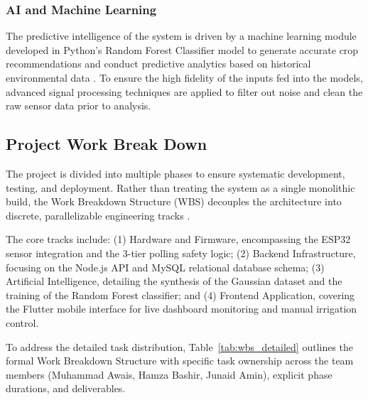 \subsubsection{AI and Machine Learning}
The predictive intelligence of the system is driven by a machine learning module developed in Python's Random Forest Classifier model to generate accurate crop recommendations and conduct predictive analytics based on historical environmental data \cite{musanase2023data}. To ensure the high fidelity of the inputs fed into the models, advanced signal processing techniques are applied to filter out noise and clean the raw sensor data prior to analysis.

\subsection{Project Work Break Down}
The project is divided into multiple phases to ensure systematic 
development, testing, and deployment. Rather than treating the system 
as a single monolithic build, the Work Breakdown Structure (WBS) 
decouples the architecture into discrete, parallelizable engineering 
tracks \cite{sommerville2016software}. 

The core tracks include: (1) Hardware and Firmware, encompassing the 
ESP32 sensor integration and the 3-tier polling safety logic; (2) 
Backend Infrastructure, focusing on the Node.js API and MySQL 
relational database schema; (3) Artificial Intelligence, detailing the 
synthesis of the Gaussian dataset and the training of the Random Forest 
classifier; and (4) Frontend Application, covering the Flutter mobile 
interface for live dashboard monitoring and manual irrigation control.


To address the detailed task distribution, Table~\ref{tab:wbs_detailed} outlines the formal Work Breakdown Structure with specific task ownership across the team members (Muhammad Awais, Hamza Bashir, Junaid Amin), explicit phase durations, and deliverables.

\renewcommand{\arraystretch}{1.4}

